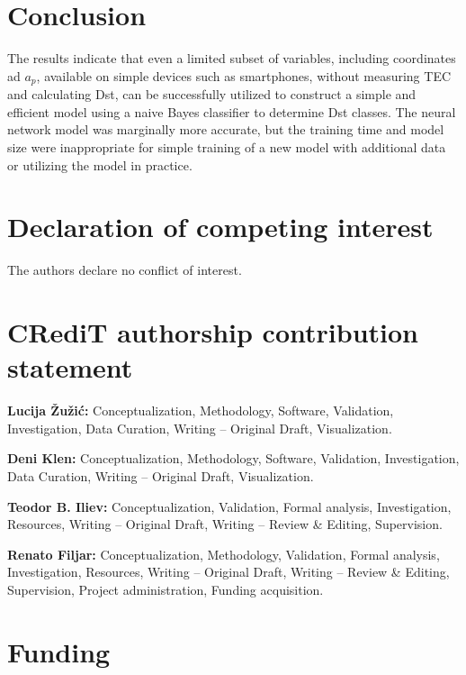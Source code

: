 \documentclass[preprint,12pt]{elsarticle}
\begin{document}
\section{Conclusion}

The results indicate that even a limited subset of variables, including coordinates ad $a_{p}$, available on simple devices such as smartphones, without measuring TEC and calculating Dst, can be successfully utilized to construct a simple and efficient model using a naive Bayes classifier to determine Dst classes. The neural network model was marginally more accurate, but the training time and model size were inappropriate for simple training of a new model with additional data or utilizing the model in practice.


\section*{Declaration of competing interest}

The authors declare no conflict of interest.

\section*{CRediT authorship contribution statement}

\textbf{Lucija \v{Z}u\v{z}i\'{c}:} Conceptualization, Methodology, Software, Validation, Investigation, Data Curation, Writing -- Original Draft, Visualization. 

\textbf{Deni Klen:} Conceptualization, Methodology, Software, Validation, Investigation, Data Curation, Writing -- Original Draft, Visualization. 

\textbf{Teodor B. Iliev:} Conceptualization,  Validation, Formal analysis, Investigation, Resources, Writing -- Original Draft, Writing -- Review \& Editing, Supervision. 

\textbf{Renato Filjar:} Conceptualization, Methodology, Validation, Formal analysis, Investigation, Resources, Writing -- Original Draft, Writing -- Review \& Editing, Supervision, Project administration, Funding acquisition.


\section*{Funding}
\end{document}

